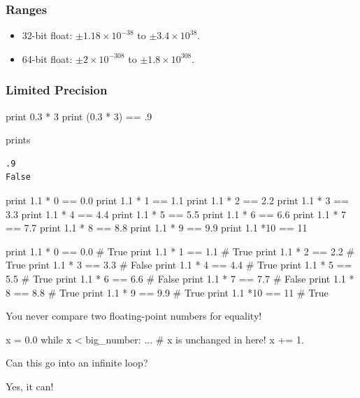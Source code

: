 \begin{frame}[fragile]
\frametitle{Ranges}

\begin{itemize}
\item 32-bit float: $\pm 1.18 \times 10^{-38}$ to $\pm 3.4 \times 10^{38}$.
\item 64-bit float: $\pm 2 \times 10^{-308}$ to $\pm 1.8 \times 10^{308}$.
\end{itemize}
\end{frame}

\begin{frame}[fragile]
\frametitle{Limited Precision}

\begin{python}

print 0.3 * 3
print (0.3 * 3) == .9
\end{python}
prints
\begin{verbatim}
.9
False
\end{verbatim}
\end{frame}

\begin{frame}[fragile]
\begin{python}
print 1.1 * 0 == 0.0  
print 1.1 * 1 == 1.1  
print 1.1 * 2 == 2.2 
print 1.1 * 3 == 3.3 
print 1.1 * 4 == 4.4 
print 1.1 * 5 == 5.5 
print 1.1 * 6 == 6.6 
print 1.1 * 7 == 7.7 
print 1.1 * 8 == 8.8 
print 1.1 * 9 == 9.9 
print 1.1 *10 == 11 
\end{python}
\end{frame}

\begin{frame}[fragile]
\begin{python}
print 1.1 * 0 == 0.0    #  True
print 1.1 * 1 == 1.1    #  True
print 1.1 * 2 == 2.2    #  True
print 1.1 * 3 == 3.3    #  False
print 1.1 * 4 == 4.4    #  True
print 1.1 * 5 == 5.5    #  True
print 1.1 * 6 == 6.6    #  False
print 1.1 * 7 == 7.7    #  False
print 1.1 * 8 == 8.8    #  True
print 1.1 * 9 == 9.9    #  True
print 1.1 *10 == 11     #  True
\end{python}
\end{frame}

\begin{frame}[fragile]
You never compare two floating-point numbers for equality!
\end{frame}

\begin{frame}[fragile]

\begin{python}
x = 0.0
while x < big_number:
    ... # x is unchanged in here!
    x += 1.
\end{python}

Can this go into an infinite loop?

\pause
Yes, it can!
\end{frame}

